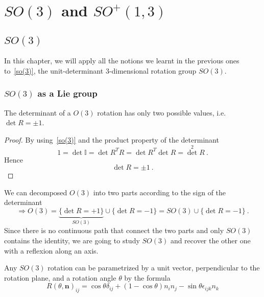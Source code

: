 \part{$SO(3)$ and $SO^+(1,3)$}

\chapter{$SO(3)$}

    In this chapter, we will apply all the notions we learnt in the previous ones to~\eqref{so(3)}, the unit-determinant $3$-dimensional rotation group $SO(3)$.

\section{$SO(3)$ as a Lie group}
    
    The determinant of a $O(3)$ rotation has only two possible values, i.e. $\det R = \pm 1$. 
    \begin{proof}
        By using~\eqref{so(3)} and the product property of the determinant
        \begin{equation*}
            1 = \det \mathbb I = \det R^T R = \det R^T \det R = {\det}^2 R ~.
        \end{equation*}
        Hence 
        \begin{equation*}
            \det R = \pm 1 ~.
        \end{equation*}
    \end{proof}

    We can decomposed $O(3)$ into two parts according to the sign of the determinant
    \begin{equation*}
        \Rightarrow O(3) = \underbrace{\{\det R = +1\}}_{SO(3)} \cup \{\det R = -1\} = SO(3) \cup \{\det R = -1\} ~.
    \end{equation*}
    Since there is no continuous path that connect the two parts and only $SO(3)$ contains the identity, we are going to study $SO(3)$ and recover the other one with a reflexion along an axis.

    Any $SO(3)$ rotation can be parametrized by a unit vector, perpendicular to the rotation plane, and a rotation angle $\theta$ by the formula
    \begin{equation*}
        R{(\theta, \mathbf n)}_{ij} = \cos \theta \delta_{ij} + (1 - \cos \theta) n_i n_j - \sin \theta \epsilon_{ijk} n_k
    \end{equation*}

